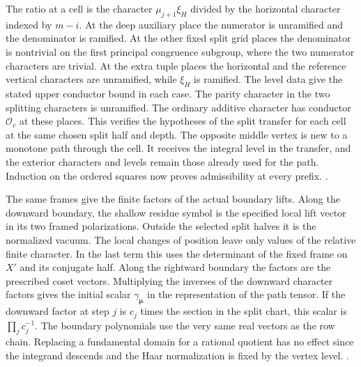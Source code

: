 The ratio at a cell is the character \(\mu_{j+1}\xi_H\) divided
by the horizontal character indexed by \(m-i\).
At the deep auxiliary place the numerator is unramified and
the denominator is ramified. At the other fixed split grid
places the denominator is nontrivial on the first principal
congruence subgroup, where the two numerator characters are
trivial. At the extra tuple places the horizontal and the
reference vertical characters are unramified, while \(\xi_H\)
is ramified. The level data give the stated upper conductor
bound in each case. The parity character in the two splitting
characters is unramified. The ordinary additive character has
conductor \(\mathcal O_v\) at these places. This verifies the
hypotheses of the split transfer for each cell at the same
chosen split half and depth. The opposite middle vertex is new
to a monotone path through the cell. It receives the integral
level in the transfer, and the exterior characters and levels
remain those already used for the path. Induction on the
ordered squares now proves admissibility at every prefix.
.

The same frames give the finite factors of the actual boundary
lifts. Along the downward boundary, the shallow residue symbol is
the specified local lift vector in its two framed polarizations.
Outside the selected split halves it is the normalized vacuum.
The local changes of position leave only values of the relative
finite character. In the last term this uses the determinant
of the fixed frame on \(X'\) and its conjugate half.
Along the rightward boundary the factors are the prescribed
coset vectors. Multiplying the inverses of the downward
character factors gives the initial scalar
\(\gamma_{\boldsymbol\mu}\) in the representation of the path
tensor. If the downward factor at step \(j\) is \(c_j\) times
the section in the split chart, this scalar is \(\prod_jc_j^{-1}\).
The boundary polynomials use the very same real vectors as the
row chain. Replacing a fundamental domain for a rational
quotient has no effect since the integrand descends and the Haar
normalization is fixed by the vertex level.
.

